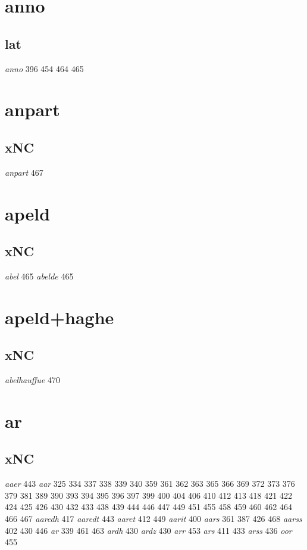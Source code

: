 \documentclass[a4paper,twocolumn]{article}
\begin{document}
\section{anno}
\label{sec:org51240b7}
\subsection{lat}
\label{sec:org80c8938}
\emph{anno} 396 454 464 465 
\section{anpart}
\label{sec:org6e0969b}
\subsection{xNC}
\label{sec:orgc848ab6}
\emph{anpart} 467 
\section{apeld}
\label{sec:org7f49b2c}
\subsection{xNC}
\label{sec:org859ec54}
\emph{abel} 465 \emph{abelde} 465 
\section{apeld+haghe}
\label{sec:orgdd1a201}
\subsection{xNC}
\label{sec:org62c6575}
\emph{abelhauffue} 470 
\section{ar}
\label{sec:org0ee0b69}
\subsection{xNC}
\label{sec:org285eecc}
\emph{aaer} 443 \emph{aar} 325 334 337 338 339 340 359 361 362 363 365 366 369 372 373 376 379 381 389 390 393 394 395 396 397 399 400 404 406 410 412 413 418 421 422 424 425 426 430 432 433 438 439 444 446 447 449 451 455 458 459 460 462 464 466 467 \emph{aaredh} 417 \emph{aaredt} 443 \emph{aaret} 412 449 \emph{aarit} 400 \emph{aars} 361 387 426 468 \emph{aarss} 402 430 446 \emph{ar} 339 461 463 \emph{ardh} 430 \emph{ardz} 430 \emph{arr} 453 \emph{ars} 411 433 \emph{arss} 436 \emph{oor} 455 
\end{document}
